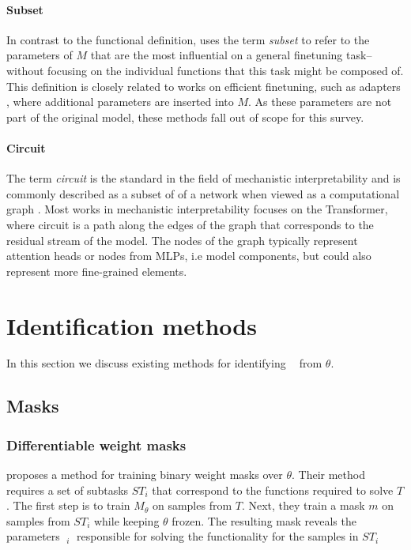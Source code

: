 \documentclass[11pt]{article}
\DeclareMathOperator*{\subnetwork}{\hat{\theta}}
\begin{document}
\paragraph{Subset}
In contrast to the functional definition, \citet{ansell-etal-2022-composable} uses the term \textit{subset} to refer to the parameters of $M$ that are the most influential on a general finetuning task--without focusing on the individual functions that this task might be composed of. This definition is closely related to works on efficient finetuning, such as adapters \citep{houlsby2019parameter}, where additional parameters are inserted into $M$. As these parameters are not part of the original model, these methods fall out of scope for this survey.
\paragraph{Circuit}
The term \textit{circuit} is the standard in the field of mechanistic interpretability and is commonly described as a subset of of a network when viewed as a computational graph \citep{conmy2023towards, nanda2023progress, wang2023interpretability}. Most works in mechanistic interpretability focuses on the Transformer, where circuit is a path along the edges of the graph that corresponds to the residual stream of the model. The nodes of the graph typically represent attention heads or nodes from MLPs, i.e model components, but could also represent more fine-grained elements.

\section{Identification methods}
In this section we discuss existing methods for identifying $\subnetwork$ from $\theta$.
\subsection{Masks}\label{section:masking}
\subsubsection{Differentiable weight masks}
\citet{csordas2020neural} proposes a method for training binary weight masks over $\theta$. Their method requires a set of subtasks $ST_i$ that correspond to the functions required to solve $T$. The first step is to train $M_\theta$ on samples from $T$.  Next, they train a mask $m$ on samples from $ST_i$ while keeping $\theta$ frozen. The resulting mask reveals the parameters $\subnetwork_i$ responsible for solving the functionality for the samples in $ST_i$
\end{document}

